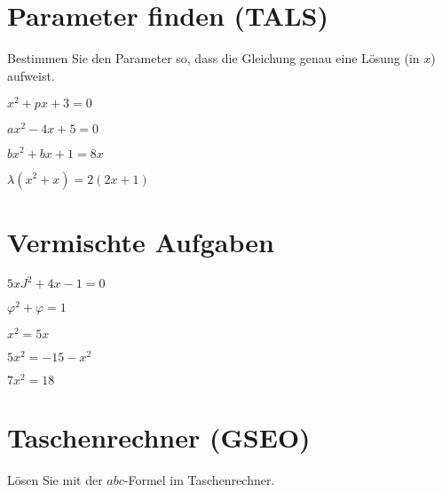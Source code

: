 \section{Parameter finden (TALS)}
Bestimmen Sie den Parameter so, dass die Gleichung genau eine Lösung
(in $x$) aufweist.

\begin{bbwAufgabenBlock}
\item $ x^2 + px + 3= 0$

\item $ ax^2 - 4x + 5= 0$

\item $bx^2 + bx + 1 =8x $

\item $ \lambda (x^2+x)=2(2x+1) $


\end{bbwAufgabenBlock}
\newpage
\section{Vermischte Aufgaben}

\begin{bbwAufgabenBlock}
\item $ 5xJ^2 + 4x - 1= 0$

\item $ \varphi^2 + \varphi = 1$

\item $ x^2= 5x$

\item $ 5x^2 = -15 - x^2 $
\LoesungsBlock{$\lx= \left\{   \right\}$}

\item $ 7x^2 = 18$


\end{bbwAufgabenBlock}
\newpage

\section{Taschenrechner (GSEO)}
Lösen Sie mit der $abc$-Formel im Taschenrechner.


